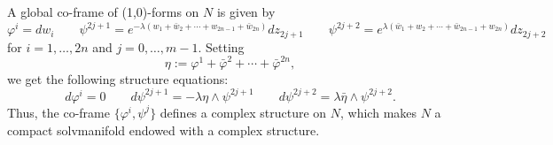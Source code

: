 \documentclass[a4paper, 11pt]{amsart}
\theoremstyle{plain}
\theoremstyle{definition}
\numberwithin{equation}{section}
\begin{document}
\bigskip
\noindent
A global co-frame of (1,0)-forms on $N$ is given by
\begin{equation*}\label{FormeNakamuraNuove}
    \varphi^{i} = dw_{i} \qquad \psi^{2j+1} = e^{-\lambda(w_{1} + \bar w_{2} + \cdots + w_{2n-1} + \bar w_{2n})}dz_{2j+1} \qquad \psi^{2j+2} = e^{\lambda(\bar w_{1} + w_{2} + \cdots + \bar w_{2n-1} + w_{2n})}dz_{2j+2}
\end{equation*}
for $i = 1, \ldots, 2n$ and $j = 0, \ldots, m-1$. Setting $$\eta := \varphi^{1} + \bar\varphi^{2} + \cdots + \bar \varphi^{2n}, $$ we get the following structure equations:
\begin{equation}\label{EqStrNakamuraNuove}
    d\varphi^{i} = 0 \qquad d\psi^{2j+1} = -\lambda\eta \wedge \psi^{2j+1} \qquad d\psi^{2j+2} = \lambda\bar\eta \wedge \psi^{2j+2}.
\end{equation}
Thus, the co-frame $\{\varphi^{i}, \psi^{j}\}$ defines a complex structure on $N$, which makes $N$ a compact  solvmanifold endowed with a complex structure.
\end{document}
